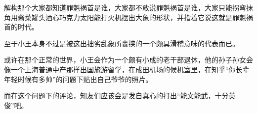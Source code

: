 \begin{zhihuanswer}
解构那个大家都知道罪魁祸首是谁，大家都不敢说罪魁祸首是谁，大家只能拐弯抹角用酱菜罐头酒心巧克力太阳能打火机摆出大象的形状，并指着它说这就是罪魁祸首的时代。

至于小王本身不过是被这出拙劣乱象所裹挟的一个颇具滑稽意味的代表而已。

或许在那个正常的世界，小王会作为一个颇有小成的老干部退休，他的孙子孙女会像一个上海普通中产那样出国旅游留学，在成田机场的候机室里，在知乎``你长辈年轻时候有多帅''的问题下贴出自己爷爷的照片。

而在这个问题下的评论，知友们应该会是发自真心的打出``能文能武，十分英俊''吧。
\end{zhihuanswer}
